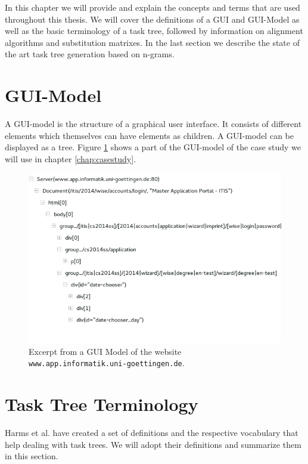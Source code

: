 In this chapter we will provide and explain the concepts and terms that are used throughout this thesis.
We will cover the definitions of a GUI and GUI-Model as well as the basic terminology of a task tree, followed by
 information on alignment algorithms and substitution matrixes.
In the last section we describe the state of the art task tree generation based on n-grams\cite{harms2013}.


\section{GUI-Model}
\label{sec:foundationguiandguimodel}
A GUI-model is the structure of a graphical user interface. It consists of different elements which themselves can have elements as children.
A GUI-model can be displayed as a tree. Figure \ref{fig:guimodel} shows a part of the GUI-model of the case study we will use in chapter \ref{chap:casestudy}.
\begin{figure}[h]
	\includegraphics[scale=0.75]{chapters/foundations/guimodel.png}
	\caption{Excerpt from a GUI Model of the website \texttt{www.app.informatik.uni-goettingen.de}.}
	\label{fig:guimodel}
\end{figure}


\section{Task Tree Terminology}
\label{sec:foundationtasktreeterminology}
Harms et al.\cite{harms2013} have created a set of definitions and the respective vocabulary that help dealing with task trees.
We will adopt their definitions and summarize them in this section.

